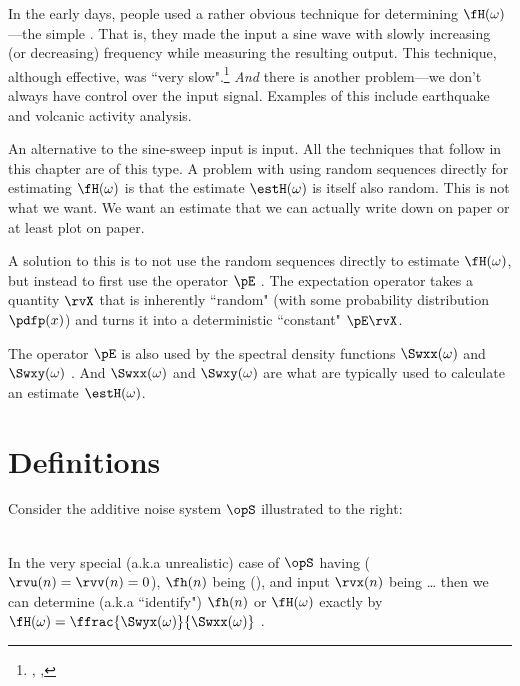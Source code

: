 In the early days, people used a rather obvious technique for determining $\fH(\omega)$---the simple
. That is, they made the input a sine wave with slowly increasing (or decreasing) 
frequency while measuring the resulting output.
This technique, although effective, was ``very slow".\footnote{
  ,
  ,
  }
\emph{And} there is another problem---we don't always have control over the input signal.
Examples of this include earthquake and volcanic activity analysis.

An alternative to the sine-sweep input is  input. 
All the techniques that follow in this chapter are of this type.
A problem with using random sequences directly for estimating $\fH(\omega)$ is that the 
estimate $\estH(\omega)$ is itself also random.
This is not what we want. We want an estimate that we can actually write down 
on paper or at least plot on paper.

A solution to this is to not use the random sequences directly to estimate $\fH(\omega)$, 
but instead to first use the  operator $\pE$ .
The expectation operator takes a quantity $\rvX$ that is inherently ``random" 
(with some probability distribution $\pdfp(x)$) and 
turns it into a deterministic ``constant" $\pE\rvX$.

The operator $\pE$ is also used by the spectral density functions 
$\Swxx(\omega)$ and $\Swxy(\omega)$ .
And $\Swxx(\omega)$ and $\Swxy(\omega)$ are what are typically used to calculate 
an estimate $\estH(\omega)$.

\section{Definitions}
\begin{minipage}{\tw-70mm}
Consider the additive noise system $\opS$ illustrated to the right:
\end{minipage}
\hfill{}
\\
In the very special (a.k.a unrealistic) case of $\opS$ having 
($\rvu(n)=\rvv(n)=0$), 
$\fh(n)$ being  (), 
and input $\rvx(n)$ being \ldots
then we can determine (a.k.a ``identify") $\fh(n)$ or $\fH(\omega)$
exactly by $\fH(\omega)=\ffrac{\Swyx(\omega)}{\Swxx(\omega)}$ .

